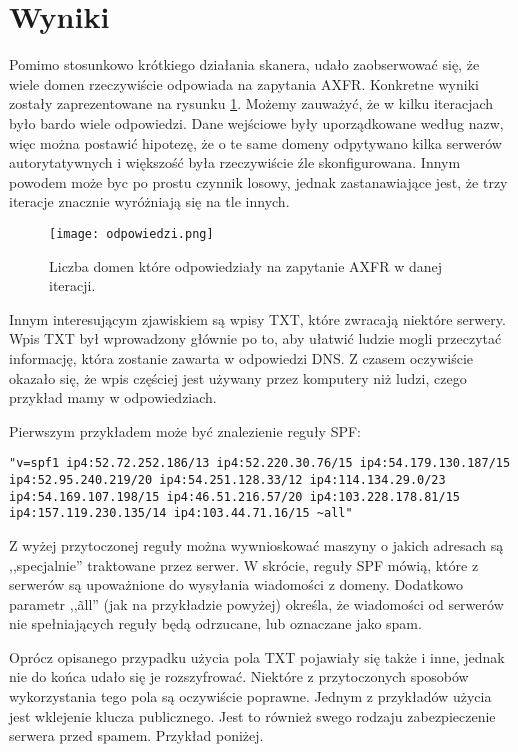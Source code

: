 \section{Wyniki}
Pomimo stosunkowo krótkiego działania skanera, udało zaobserwować się, że wiele domen rzeczywiście odpowiada na zapytania AXFR. Konkretne wyniki zostały zaprezentowane na rysunku \ref{fig:odpowiedzi}. Możemy zauważyć, że w kilku iteracjach było bardo wiele odpowiedzi. Dane wejściowe były uporządkowane według nazw, więc można postawić hipotezę, że o te same domeny odpytywano kilka serwerów autorytatywnych i większość była rzeczywiście źle skonfigurowana. Innym powodem może byc po prostu czynnik losowy, jednak zastanawiające jest, że trzy iteracje znacznie wyróżniają się na tle innych.


\begin{figure}
    \centering
        \texttt{[image: odpowiedzi.png]}
    \caption{ Liczba domen które odpowiedziały na zapytanie AXFR w danej iteracji.} \label{fig:odpowiedzi}
\end{figure}


Innym interesującym zjawiskiem są wpisy TXT\cite{RFC1035}, które zwracają niektóre serwery. Wpis TXT był wprowadzony głównie po to, aby ułatwić ludzie mogli przeczytać informację, która zostanie zawarta w odpowiedzi DNS. Z czasem oczywiście okazało się, że wpis częściej jest używany przez komputery niż ludzi, czego przykład mamy w odpowiedziach.

Pierwszym przykładem może być znalezienie reguły SPF\cite{RFC7208}:
\begin{lstlisting}
"v=spf1 ip4:52.72.252.186/13 ip4:52.220.30.76/15 ip4:54.179.130.187/15 ip4:52.95.240.219/20 ip4:54.251.128.33/12 ip4:114.134.29.0/23 ip4:54.169.107.198/15 ip4:46.51.216.57/20 ip4:103.228.178.81/15 ip4:157.119.230.135/14 ip4:103.44.71.16/15 ~all"
\end{lstlisting}

Z wyżej przytoczonej reguły można wywnioskować maszyny o jakich adresach są ,,specjalnie'' traktowane przez serwer. W skrócie, reguły SPF mówią, które z serwerów są upoważnione do wysyłania wiadomości z domeny. Dodatkowo parametr ,,\~all'' (jak na przykładzie powyżej) określa, że wiadomości od serwerów nie spełniających reguły będą odrzucane, lub oznaczane jako spam.

Oprócz opisanego przypadku użycia pola TXT pojawiały się także i inne, jednak nie do końca udało się je rozszyfrować. Niektóre z przytoczonych sposobów wykorzystania tego pola są oczywiście poprawne. Jednym z przykładów użycia jest wklejenie klucza publicznego. Jest to również swego rodzaju zabezpieczenie serwera przed spamem. Przykład poniżej.

